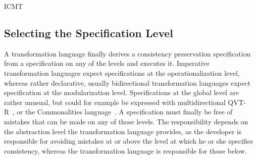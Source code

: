 \begin{copiedFrom}{ICMT}


\subsection{Selecting the Specification Level}

A transformation language finally derives a consistency preservation specification from a specification on any of the levels and executes it. %
Imperative transformation languages expect specifications at the operationalization level, whereas rather declarative, usually bidirectional transformation languages expect specification at the modularization level.
Specifications at the global level are rather unusual, but could for example be expressed with multidirectional QVT-R~\cite{macedo2014a}, or the Commonalities language~\cite{gleitze2017a}.
A specification must finally be free of mistakes that can be made on any of those levels. 
The responsibility depends on the abstraction level the transformation language provides, as the developer is responsible for avoiding mistakes at or above the level at which he or she specifies consistency, whereas the transformation language is responsible for those below.


\end{copiedFrom}
